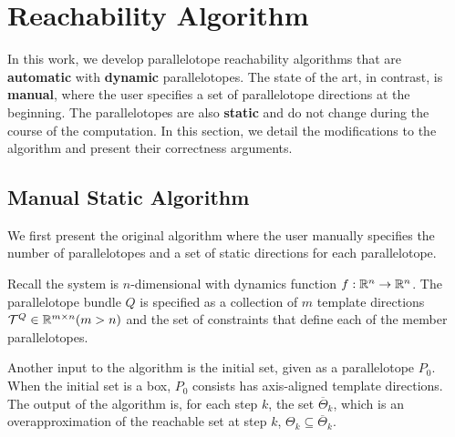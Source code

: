 \vspace{-1.2em}
\section{Reachability Algorithm}
\label{sec:theory}

In this work, we develop parallelotope reachability algorithms that are \textbf{automatic} with \textbf{dynamic} parallelotopes.
%
The state of the art, in contrast, is \textbf{manual}, where the user specifies a set of parallelotope directions at the beginning.
%
The parallelotopes are also \textbf{static} and do not change during the course of the computation.
%
In this section, we detail the modifications to the algorithm and present their correctness arguments.

\subsection{Manual Static Algorithm}
\label{sec:manualstatic}

We first present the original algorithm\cite{dang2012reachability} where the user manually specifies the number of parallelotopes and a set of static directions for each parallelotope.

Recall the system is $n$-dimensional with dynamics function $f: \reals^{n} \rightarrow \reals^{n}$.
%
The parallelotope bundle $Q$ is specified as a collection of $m$ template directions $\T^{Q} \in \reals^{m \times n} (m > n)$ and the set of constraints that define each of the member parallelotopes.
%

%
%
Another input to the algorithm is the initial set, given as a parallelotope $P_0$.
%
When the initial set is a box, $P_0$ consists has axis-aligned template directions.
%
The output of the algorithm is, for each step $k$, the set $\overline\Theta_k$, which is an overapproximation of the reachable set at step $k$, $\Theta_k \subseteq \overline\Theta_k$.

